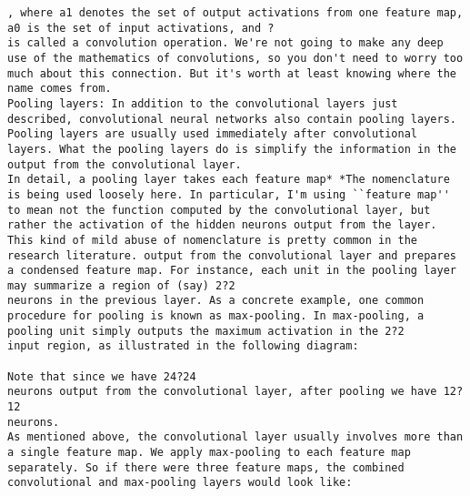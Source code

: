 \begin{lstlisting}
, where a1 denotes the set of output activations from one feature map, a0 is the set of input activations, and ?
is called a convolution operation. We're not going to make any deep use of the mathematics of convolutions, so you don't need to worry too much about this connection. But it's worth at least knowing where the name comes from.
Pooling layers: In addition to the convolutional layers just described, convolutional neural networks also contain pooling layers. Pooling layers are usually used immediately after convolutional layers. What the pooling layers do is simplify the information in the output from the convolutional layer.
In detail, a pooling layer takes each feature map* *The nomenclature is being used loosely here. In particular, I'm using ``feature map'' to mean not the function computed by the convolutional layer, but rather the activation of the hidden neurons output from the layer. This kind of mild abuse of nomenclature is pretty common in the research literature. output from the convolutional layer and prepares a condensed feature map. For instance, each unit in the pooling layer may summarize a region of (say) 2?2
neurons in the previous layer. As a concrete example, one common procedure for pooling is known as max-pooling. In max-pooling, a pooling unit simply outputs the maximum activation in the 2?2
input region, as illustrated in the following diagram:

Note that since we have 24?24
neurons output from the convolutional layer, after pooling we have 12?12
neurons.
As mentioned above, the convolutional layer usually involves more than a single feature map. We apply max-pooling to each feature map separately. So if there were three feature maps, the combined convolutional and max-pooling layers would look like:


\end{lstlisting}

